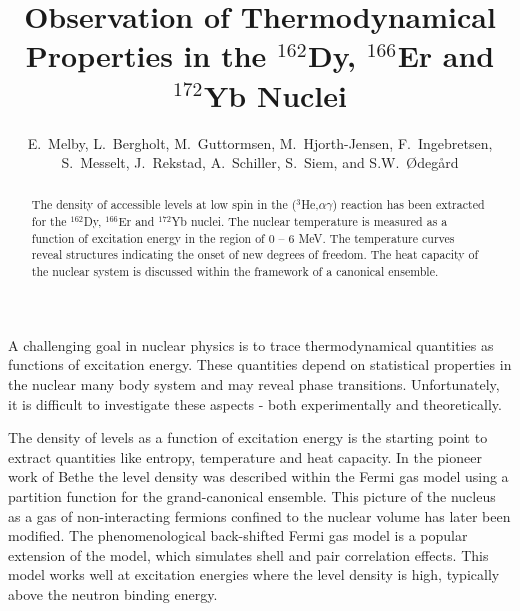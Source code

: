
\draft


\title{Observation of Thermodynamical Properties in the $^{162}$Dy,
$^{166}$Er and $^{172}$Yb Nuclei}


\author{E.~Melby, L.~Bergholt, M.~Guttormsen, M.~Hjorth-Jensen,
F.~Ingebretsen, S.~Messelt, J.~Rekstad, A.~Schiller, S.~Siem, and
S.W.~{\O}deg{\aa}rd}
\address{Department of Physics, University of Oslo,
Box 1048 Blindern, N-0316 Oslo, Norway}

\maketitle

\begin{abstract}
The density of accessible levels at low spin in the ($^3$He,$\alpha
\gamma$) reaction has been extracted for the $^{162}$Dy, $^{166}$Er and
$^{172}$Yb nuclei. The nuclear temperature is measured as a function of
excitation energy in the region of 0 -- 6 MeV. The temperature curves
reveal structures indicating the onset of new degrees of freedom. The heat
capacity of the nuclear system is
discussed within the framework of a canonical ensemble. \end{abstract}


A challenging goal in nuclear physics is to trace thermodynamical
quantities as functions of excitation energy. These quantities depend on
statistical properties in the nuclear many body system and may reveal phase
transitions. Unfortunately, it is difficult to investigate these aspects -
both experimentally and theoretically.

The density of levels as a function of excitation energy is the starting
point to extract quantities like entropy, temperature and heat capacity. In
the pioneer work of Bethe \cite{1} the level density was described within
the Fermi gas model using a partition function for the grand-canonical
ensemble. This picture of the nucleus as a gas of non-interacting fermions
confined to the nuclear volume has later been modified. The
phenomenological back-shifted Fermi gas model \cite{2} is a popular
extension of the model, which simulates shell and pair correlation effects.
This model works well at excitation energies where the level density is
high, typically above the neutron binding energy.

